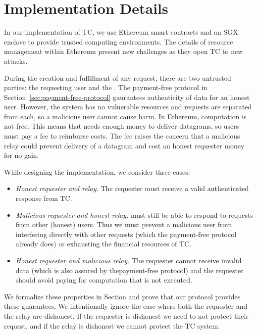 
\section{\tc Implementation Details}
\label{sec:impl}

In our implementation of TC, we use Ethereum smart contracts and an SGX enclave to provide trusted computing environments.
The details of resource management within Ethereum present new challenges as they open TC to new attacks.

During the creation and fulfillment of any request, there are two untrusted parties: the requesting user and the \tc \medname.
The payment-free protocol in Section~\ref{sec:payment-free-protocol} gaurantees authenticity of data for an honest user.
However, the \tc system has no vulnerable resources and requests are separated from each, so a malicious user cannot cause harm.
In Ethereum, computation is not free.
This means that \tc needs enough money to deliver datagrams, so users must pay a fee to reimburse costs.
The fee raises the concern that a malicious relay could prevent delivery of a datagram and cost an honest requester money for no gain.

While designing the implementation, we consider three cases:
\begin{itemize}
  \item {\it Honest requester and relay.}
    The requester must receive a valid authenticated response from TC.

  \item {\it Malicious requester and honest relay.}
    \tc must still be able to respond to requests from other (honest) users.
    Thus we must prevent a malicious user from interfering directly with other requests (which the payment-free protocol already does)
    or exhausting the financial resources of TC.

  \item {\it Honest requester and malicious relay.}
    The requester cannot receive invalid data (which is also assured by thepayment-free protocol)
    and the requester should avoid paying for computation that is not executed.
\end{itemize}
We formalize these properties in Section  and prove that our protocol provides these guarantees.
We intentionally ignore the case where both the requester and the relay are dishonest.
If the requester is dishonest we need to not protect their request, and if the relay is dishonest we cannot protect the TC system.


